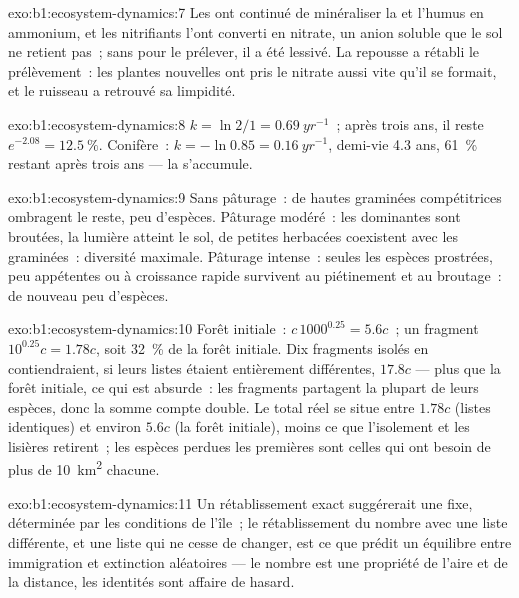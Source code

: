 \begin{solution}{exo:b1:ecosystem-dynamics:7}
Les  ont continué de minéraliser la  et l'humus en
ammonium, et les nitrifiants l'ont converti en nitrate, un anion
soluble que le sol ne retient pas~; sans  pour le prélever, il a
été lessivé. La repousse a rétabli le prélèvement~: les plantes
nouvelles ont pris le nitrate aussi vite qu'il se formait, et le
ruisseau a retrouvé sa limpidité.
\end{solution}

\begin{solution}{exo:b1:ecosystem-dynamics:8}
$k = \ln 2/1 = \qty{0.69}{yr^{-1}}$~; après trois ans, il reste $e^{-2.08} =
\qty{12.5}{\%}$. Conifère~: $k = -\ln 0.85 = \qty{0.16}{yr^{-1}}$,
demi-vie \num{4.3} ans, \qty{61}{\%} restant après trois ans --- la
 s'accumule.
\end{solution}

\begin{solution}{exo:b1:ecosystem-dynamics:9}
Sans pâturage~: de hautes graminées compétitrices ombragent le reste,
peu d'espèces. Pâturage modéré~: les dominantes sont broutées, la
lumière atteint le sol, de petites herbacées coexistent avec les
graminées~: diversité maximale. Pâturage intense~: seules les espèces
prostrées, peu appétentes ou à croissance rapide survivent au piétinement
et au broutage~: de nouveau peu d'espèces.
\end{solution}

\begin{solution}{exo:b1:ecosystem-dynamics:10}
Forêt initiale~: $c\,1000^{0.25} = 5.6c$~; un fragment $10^{0.25}c = 1.78c$,
soit \qty{32}{\%} de la forêt initiale. Dix fragments isolés en
contiendraient, si leurs listes étaient entièrement différentes,
$17.8c$ --- plus que la forêt initiale, ce qui est absurde~: les
fragments partagent la plupart de leurs espèces, donc la somme compte
double. Le total réel se situe entre $1.78c$ (listes identiques) et
environ $5.6c$ (la forêt initiale), moins ce que l'isolement et les
lisières retirent~; les espèces perdues les premières sont celles qui
ont besoin de plus de \qty{10}{km^2} chacune.
\end{solution}

\begin{solution}{exo:b1:ecosystem-dynamics:11}
Un rétablissement exact suggérerait une  fixe, déterminée par
les conditions de l'île~; le rétablissement du nombre avec une liste
différente, et une liste qui ne cesse de changer, est ce que prédit un
équilibre entre immigration et extinction aléatoires --- le nombre est
une propriété de l'aire et de la distance, les identités sont affaire
de hasard.
\end{solution}

